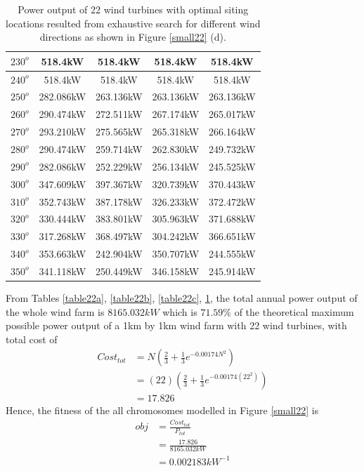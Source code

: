 \begin{table}[H]
\begin{tabular}{|c|c|c|c|c|}
		$230^o$	& 518.4kW	& 518.4kW	& 518.4kW	& 518.4kW	\\ \hline
		$240^o$	& 518.4kW	& 518.4kW	& 518.4kW	& 518.4kW	\\ \hline
		$250^o$	& 282.086kW	& 263.136kW	& 263.136kW	& 263.136kW	\\ \hline
		$260^o$	& 290.474kW	& 272.511kW	& 267.174kW	& 265.017kW	\\ \hline
		$270^o$	& 293.210kW	& 275.565kW	& 265.318kW	& 266.164kW	\\ \hline
		$280^o$	& 290.474kW	& 259.714kW	& 262.830kW	& 249.732kW	\\ \hline
		$290^o$	& 282.086kW	& 252.229kW	& 256.134kW	& 245.525kW	\\ \hline
		$300^o$	& 347.609kW	& 397.367kW	& 320.739kW	& 370.443kW	\\ \hline
		$310^o$	& 352.743kW	& 387.178kW	& 326.233kW	& 372.472kW	\\ \hline
		$320^o$	& 330.444kW	& 383.801kW	& 305.963kW	& 371.688kW	\\ \hline
		$330^o$	& 317.268kW	& 368.497kW	& 304.242kW	& 366.651kW	\\ \hline
		$340^o$	& 353.663kW	& 242.904kW	& 350.707kW	& 244.555kW	\\ \hline
		$350^o$	& 341.118kW	& 250.449kW	& 346.158kW	& 245.914kW	\\ \hline
        	\end{tabular}
        	\caption{Power output of 22 wind turbines with optimal siting locations resulted from exhaustive search for different wind directions as shown in Figure \ref{small22} (d).}
        	\label{table22d}
        \end{table}
        \doublespacing
        
        From Tables \ref{table22a}, \ref{table22b}, \ref{table22c}, \ref{table22d}, the total annual power output of the whole wind farm is $8165.032kW$ which is $71.59\%$ of the theoretical maximum possible power output of a 1km by 1km wind farm with 22 wind turbines, with total cost of
        \begin{align*}
            Cost_{tot}
            &= N\left(\frac{2}{3} + \frac{1}{3}e^{-0.00174N^2}\right) \\
            &= \left(22\right)\left(\frac{2}{3} + \frac{1}{3}e^{-0.00174\left(22^2\right)}\right) \\
            &=17.826
        \end{align*}
        Hence, the fitness of the all chromosomes modelled in Figure \ref{small22} is
        \begin{align*}
            obj
            &=\frac{Cost_{tot}}{P_{tot}} \\
            &=\frac{17.826}{8165.032kW} \\
            &=0.002183kW^{-1}
        \end{align*}
        
